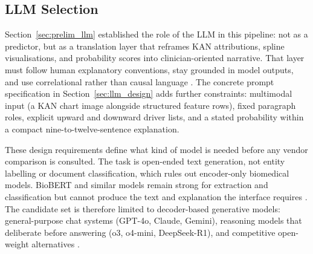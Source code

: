 \documentclass[12pt, a4paper]{article}
\begin{document}
\subsection{LLM Selection}
\label{sec:prelim_llm_selection}

Section~\ref{sec:prelim_llm} established the role of the LLM in this
pipeline: not as a predictor, but as a translation layer that reframes KAN
attributions, spline visualisations, and probability scores into
clinician-oriented narrative.
That layer must follow human explanatory conventions, stay grounded in model
outputs, and use correlational rather than causal language
\citep{lee2025prompt, dams2025tell, omar2025hallucination}.
The concrete prompt specification in Section~\ref{sec:llm_design} adds further
constraints: multimodal input (a KAN chart image alongside structured feature
rows), fixed paragraph roles, explicit upward and downward driver lists, and a
stated probability within a compact nine-to-twelve-sentence explanation.

These design requirements define what kind of model is needed before any
vendor comparison is consulted.
The task is open-ended text generation, not entity labelling or document
classification, which rules out encoder-only biomedical models.
BioBERT and similar models remain strong for extraction and classification
but cannot produce the text and explanation the interface requires
\citep{lee2020biobert, luo2022biogpt}.
The candidate set is therefore limited to decoder-based generative models:
general-purpose chat systems (GPT-4o, Claude, Gemini), reasoning models that
deliberate before answering (o3, o4-mini, DeepSeek-R1), and competitive
open-weight alternatives \citep{nori2023gpt4, sandmann2025deepseek}.
\end{document}
